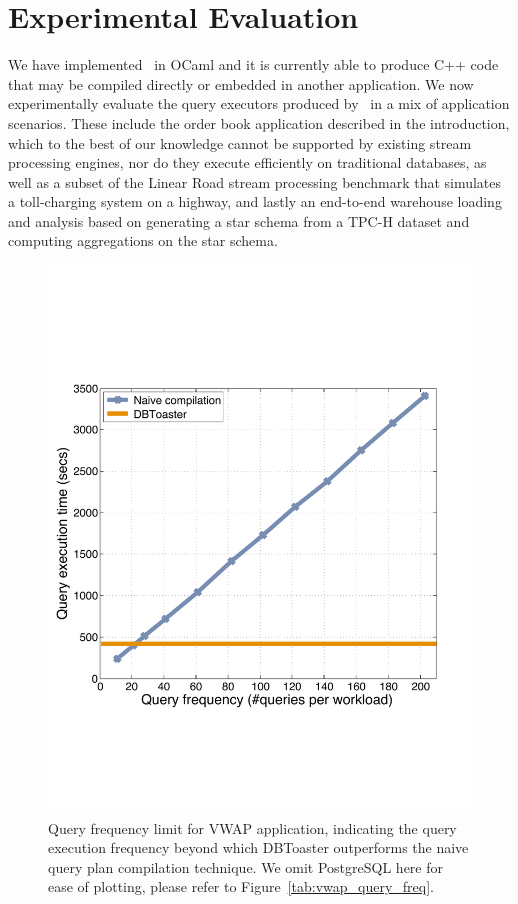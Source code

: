 

\section{Experimental Evaluation}

We have implemented \compiler\ in OCaml and it is currently able to produce C++
code that may be compiled directly or embedded in another application. We now
experimentally evaluate the query executors produced by \compiler\ in a mix of
application scenarios. These include the order book application described in the
introduction, which to the best of our knowledge cannot be supported by existing
stream processing engines, nor do they execute efficiently on traditional
databases, as well as a subset of the Linear Road stream processing benchmark
that simulates a toll-charging system on a highway, and lastly an end-to-end
warehouse loading and analysis based on generating a star schema from a TPC-H
dataset and computing aggregations on the star schema.

\begin{figure}[tb]
\begin{center}
\includegraphics[scale=0.4]{../plots/vwap_query_freq_dn.pdf}
\end{center}
\vspace{-4mm}
\caption{Query frequency limit for VWAP application, indicating the
query execution frequency beyond which DBToaster outperforms the naive query
plan compilation technique. We omit PostgreSQL here for ease of
plotting, please refer to Figure~\ref{tab:vwap_query_freq}.}
\label{fig:vwap_query_freq}
\end{figure}


